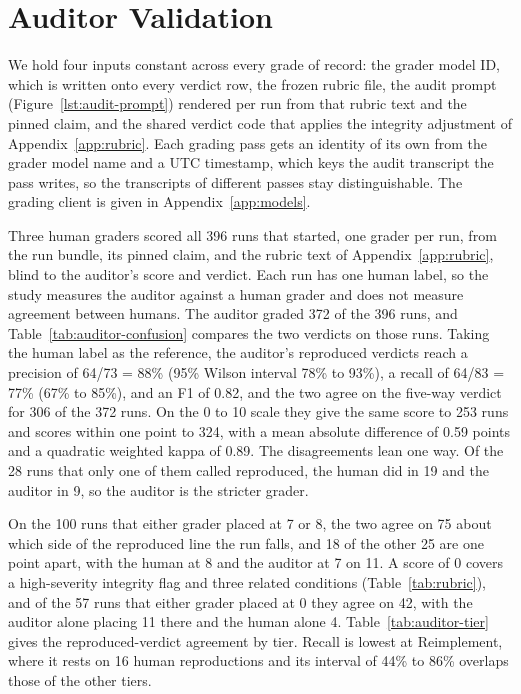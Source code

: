 \section{Auditor Validation}
\label{app:auditor-validation}

We hold four inputs constant across every grade of record: the grader model ID,
which is written onto every verdict row, the frozen rubric file, the audit prompt (Figure~\ref{lst:audit-prompt}) rendered per run from that rubric text and the
pinned claim, and the shared verdict code that applies the integrity adjustment
of Appendix~\ref{app:rubric}. Each grading pass gets an identity of its own from
the grader model name and a UTC timestamp, which keys the audit transcript
the pass writes, so the transcripts of different passes stay
distinguishable. The grading client is given in
Appendix~\ref{app:models}.

Three human graders scored all 396 runs that started, one grader per run, from
the run bundle, its pinned claim, and the rubric text of
Appendix~\ref{app:rubric}, blind to the auditor's score and verdict. Each run
has one human label, so the study measures the auditor against a human grader
and does not measure agreement between humans. The auditor graded 372 of the
396 runs, and Table~\ref{tab:auditor-confusion} compares the two verdicts on
those runs. Taking the human label as the reference, the auditor's reproduced
verdicts reach a precision of 64/73 = 88\% (95\% Wilson interval 78\% to
93\%), a recall of 64/83 = 77\% (67\% to 85\%), and an F1 of 0.82, and the two
agree on the five-way verdict for 306 of the 372 runs. On the 0 to 10 scale
they give the same score to 253 runs and scores within one point to 324, with
a mean absolute difference of 0.59 points and a quadratic weighted kappa of
0.89. The disagreements lean one way. Of
the 28 runs that only one of them called reproduced, the human did in 19 and
the auditor in 9, so the auditor is the stricter grader.

On the 100 runs that either grader placed at 7 or 8, the two agree on 75 about
which side of the reproduced line the run falls, and 18 of the other 25 are
one point apart, with the human at 8 and the auditor at 7 on 11. A score of 0 covers a
high-severity integrity flag and three related conditions
(Table~\ref{tab:rubric}), and of the 57 runs that either grader placed at 0
they agree on 42, with the auditor alone placing 11 there and the human
alone 4. Table~\ref{tab:auditor-tier} gives the reproduced-verdict
agreement by tier. Recall is lowest at Reimplement, where it rests on 16 human
reproductions and its interval of 44\% to 86\% overlaps those of the other
tiers.


